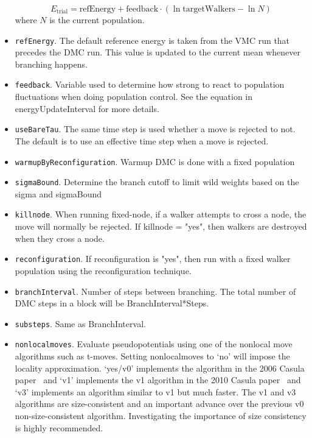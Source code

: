 \begin{itemize}
\[
E_{\text{trial}}=
\textrm{refEnergy}+\textrm{feedback}\cdot(\ln\textrm{targetWalkers}-\ln N)
\]
where $N$ is the current population.

\item \texttt{refEnergy}. The default reference energy is taken from the VMC run that precedes the DMC run. This value is updated to the current mean whenever branching happens.

\item \texttt{feedback}. Variable used to determine how strong to react to population fluctuations when doing population control.  See the equation in energyUpdateInterval for more details.

\item \texttt{useBareTau}. The same time step is used whether a move is rejected to not. The default is to use an effective time step when a move is rejected.

\item \texttt{warmupByReconfiguration}.  Warmup DMC is done with a fixed population

\item \texttt{sigmaBound}.  Determine the branch cutoff to limit wild weights based on the sigma and sigmaBound

\item \texttt{killnode}.  When running fixed-node, if a walker attempts to cross a node, the move will normally be rejected.  If killnode = "yes", then walkers are destroyed when they cross a node.


\item \texttt{reconfiguration}.  If reconfiguration is "yes", then run with a fixed walker population using the reconfiguration technique.  

\item \texttt{branchInterval}. Number of steps between branching.  The total number of DMC steps in a block will be BranchInterval*Steps.   

\item \texttt{substeps}.  Same as BranchInterval.


\item \texttt{nonlocalmoves}. Evaluate pseudopotentials using one of the nonlocal move algorithms such as t-moves.  Setting nonlocalmoves to `no' will impose the locality approximation. `yes/v0' implements the algorithm in the 2006 Casula paper~\cite{Casula2006} and `v1' implements the v1 algorithm in the 2010 Casula paper~\cite{Casula2010} and `v3' implements an algorithm similar to v1 but much faster.
The v1 and v3 algorithms are size-consistent and an important advance over the previous v0 non-size-consistent algorithm. Investigating the importance of size consistency is highly recommended.


\end{itemize}
